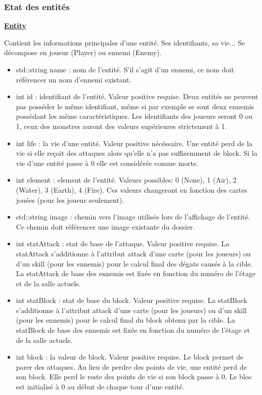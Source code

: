 \subsubsection{Etat des entités}
\underline{\textbf{Entity}}
\par Contient les informations principales d'une entité. Ses identifiants, sa vie... Se décompose en joueur (Player) ou ennemi (Enemy).
\begin{itemize}
    \item std::string name : nom de l'entité. S'il s'agit d'un ennemi, ce nom doit référencer un nom d'ennemi existant.
    \item int id : identifiant de l'entité. Valeur positive requise. Deux entités ne peuvent pas posséder le même identifiant, même si par exemple se sont deux ennemis possèdant les même caractéristiques. Les identifiants des joueurs seront 0 ou 1, ceux des monstres auront des valeurs supérieures strictement à 1.
    \item int life : la vie d'une entité. Valeur positive nécéssaire. Une entité perd de la vie si elle reçoit des attaques alors qu'elle n'a pas suffisemment de block. Si la vie d'une entité passe à 0 elle est considérée comme morte.
    \item int element : element de l'entité. Valeurs possibles: 0 (None), 1 (Air), 2 (Water), 3 (Earth), 4 (Fire). Ces valeurs changeront en fonction des cartes jouées (pour les joueur seulement).
    \item std::string image : chemin vers l'image utilisée lors de l'affichage de l'entité. Ce chemin doit référencer une image existante du dossier.
    \item int statAttack : stat de base de l'attaque. Valeur positive requise. La statAttack s'additionne à l'attribut attack d'une carte (pour les joueurs) ou d'un skill (pour les ennemis) pour le calcul final des dégats causés à la cible. La statAttack de base des ennemis est fixée en fonction du numéro de l'étage  et de la salle actuels.
    \item int statBlock : stat de base du block. Valeur positive requise. La statBlock s'additionne à l'attribut attack d'une carte (pour les joueurs) ou d'un skill (pour les ennemis) pour le calcul final du block obtenu par la cible.  La statBlock de base des ennemis est fixée en fonction du numéro de l'étage et de la salle actuels.
    \item int block : la valeur de block. Valeur positive requise. Le block permet de parer des attaques. Au lieu de perdre des points de vie, une entité perd de son block. Elle perd le reste des points de vie si son block passe à 0. Le bloc est initialisé à 0 au début de chaque tour d'une entité.

\end{itemize}
